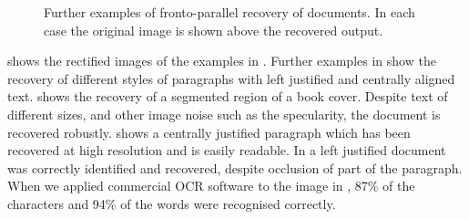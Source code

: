 \begin{figure}[t]
\begin{center}

\end{center}
\vspace*{-3mm}
\caption{Further examples of fronto-parallel recovery of documents. In each case the original image is shown above the recovered output.}
\label{againmoreppresults}
\end{figure}

 shows the rectified images of the examples in
. 
Further examples in 
show the recovery of different styles of paragraphs with left justified and
centrally aligned text.
 shows the recovery of a segmented region of a book cover.  Despite 
text of different sizes, and other image noise such as the specularity, the document is recovered robustly.
 shows a centrally justified paragraph which has been recovered at high resolution and is easily readable.
In  a left justified document was correctly identified and recovered, despite occlusion of part of the paragraph.
When we applied commercial OCR software to the image in , 87\% of the characters and 94\% of the words were recognised correctly.
